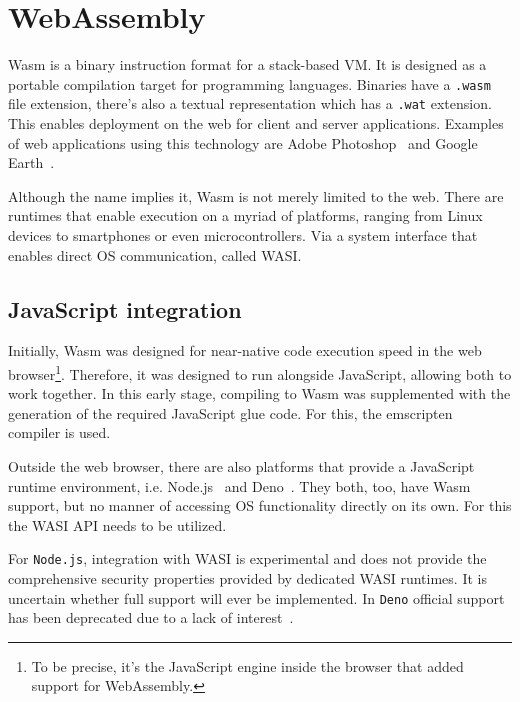 \section{WebAssembly}
\label{chap:wasm}

\gls{Wasm} is a binary instruction format for a stack-based \gls{VM}. It is designed as a portable compilation target for programming languages. Binaries have a \texttt{.wasm} file extension, there's also a textual representation which has a \texttt{.wat} extension. This enables deployment on the web for client and server applications. Examples of web applications using this technology are Adobe Photoshop~\cite{wasm:ps} and Google Earth~\cite{wasm:ge}.

Although the name implies it, \gls{Wasm} is not merely limited to the web. There are runtimes that enable execution on a myriad of platforms, ranging from Linux devices to smartphones or even microcontrollers. Via a system interface that enables direct \gls{OS} communication, called \gls{WASI}.

\subsection{JavaScript integration}

Initially, \gls{Wasm} was designed for near-native code execution speed in the web browser\footnote{To be precise, it's the JavaScript engine inside the browser that added support for WebAssembly.}. Therefore, it was designed to run alongside JavaScript, allowing both to work together. In this early stage, compiling to \gls{Wasm} was supplemented with the generation of the required JavaScript glue code. For this, the emscripten~\cite{gh:emscripten} compiler is used.

Outside the web browser, there are also platforms that provide a JavaScript runtime environment, i.e. Node.js~\cite{nodejs} and Deno~\cite{deno}. They both, too, have \gls{Wasm} support, but no manner of accessing \gls{OS} functionality directly on its own. For this the \gls{WASI} \gls{API} needs to be utilized.

For \texttt{Node.js}, integration with \gls{WASI} is experimental and does not provide the comprehensive security properties provided by dedicated \gls{WASI} runtimes. It is uncertain whether full support will ever be implemented. In \texttt{Deno} official support has been deprecated due to a lack of interest~\cite{deno:wasi}.
